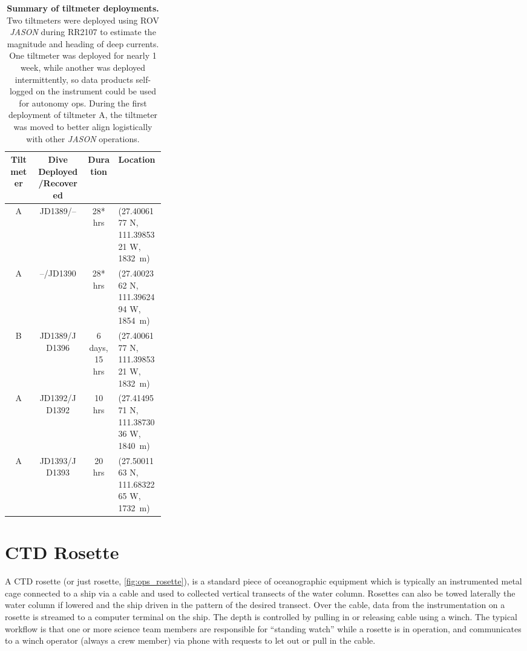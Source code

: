 \begin{table}[h!]
  \centering
  \begin{tabular}{c|c|c|p{0.3\linewidth}}
      Tiltmeter & Dive Deployed/Recovered & Duration & Location \\
      \hline
      A & JD1389/-- & 28* hrs & (27.4006177 N, 111.3985321 W, \SI{1832}{\meter}) \\
      A & --/JD1390 & 28* hrs & (27.4002362 N, 111.3962494 W, \SI{1854}{\meter}) \\
      B & JD1389/JD1396 & 6 days, 15 hrs & (27.4006177 N, 111.3985321 W, \SI{1832}{\meter}) \\
      A & JD1392/JD1392 & 10 hrs & (27.4149571 N, 111.3873036 W, \SI{1840}{\meter}) \\
      A & JD1393/JD1393 & 20 hrs & (27.5001163 N, 111.6832265 W, \SI{1732}{\meter}) \\
  \end{tabular}
  \caption[Summary of tiltmeter deployments]{\textbf{Summary of tiltmeter deployments.} Two tiltmeters were deployed using ROV \emph{JASON} during RR2107 to estimate the magnitude and heading of deep currents. One tiltmeter was deployed for nearly 1 week, while another was deployed intermittently, so data products self-logged on the instrument could be used for autonomy ops. During the first deployment of tiltmeter A, the tiltmeter was moved to better align logistically with other \emph{JASON} operations.}
  \label{tab:ops_tilt}
\end{table}


\section{CTD Rosette}
A CTD rosette (or just rosette, \cref{fig:ops_rosette}), is a standard piece of oceanographic equipment which is typically an instrumented metal cage connected to a ship via a cable and used to collected vertical transects of the water column. Rosettes can also be towed laterally the water column if lowered and the ship driven in the pattern of the desired transect. Over the cable, data from the instrumentation on a rosette is streamed to a computer terminal on the ship. The depth is controlled by pulling in or releasing cable using a winch. The typical workflow is that one or more science team members are responsible for ``standing watch'' while a rosette is in operation, and communicates to a winch operator (always a crew member) via phone with requests to let out or pull in the cable.

